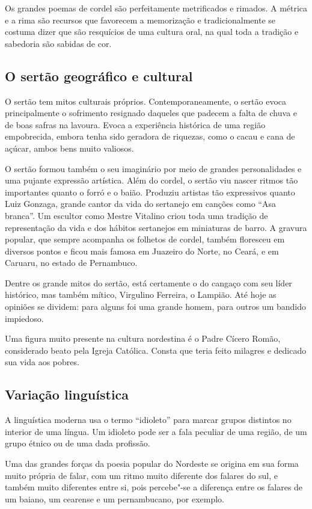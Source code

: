 Os grandes poemas de cordel são perfeitamente metrificados e rimados. A métrica
e a rima são recursos que favorecem a memorização e tradicionalmente se costuma
dizer que são resquícios de uma cultura oral, na qual toda a tradição e
sabedoria são sabidas de cor.  


\subsection{O sertão geográfico e cultural}

O sertão tem mitos culturais próprios. Contemporaneamente, o sertão evoca
principalmente o sofrimento resignado daqueles que padecem a falta de chuva e
de boas safras na lavoura. Evoca a experiência histórica de uma região
empobrecida, embora tenha sido geradora de riquezas, como o cacau e cana de
açúcar, ambos bens muito valiosos. 

O sertão formou também o seu imaginário por meio de grandes personalidades e
uma pujante expressão artística. Além do cordel, o sertão viu nascer ritmos tão
importantes quanto o forró e o baião. Produziu artistas tão expressivos quanto
Luiz Gonzaga, grande cantor da vida do sertanejo em canções como “Asa branca”.
Um escultor como Mestre Vitalino criou toda uma tradição de representação da
vida e dos hábitos sertanejos em miniaturas de barro. A gravura popular, que
sempre acompanha os folhetos de cordel, também floresceu em diversos pontos e
ficou mais famosa em Juazeiro do Norte, no Ceará, e em Caruaru, no estado de
Pernambuco. 

Dentre os grande mitos do sertão, está certamente o do cangaço com seu líder
histórico, mas também mítico, Virgulino Ferreira, o Lampião. Até hoje as
opiniões se dividem: para alguns foi uma grande homem, para outros um bandido
impiedoso. 

Uma figura muito presente na cultura nordestina é o Padre Cícero Romão,
considerado beato pela Igreja Católica. Consta que teria feito milagres e
dedicado sua vida aos pobres. 

\subsection{Variação linguística}

A linguística moderna usa o termo “idioleto” para marcar grupos distintos no
interior de uma língua. Um idioleto pode ser a fala peculiar de uma região, de
um grupo étnico ou de uma dada profissão. 

Uma das grandes forças da poesia popular do Nordeste se origina em sua forma
muito própria de falar, com um ritmo muito diferente dos falares do sul, e
também muito diferentes entre si, pois percebe"-se a diferença entre os falares
de um baiano, um cearense e um pernambucano, por exemplo.

